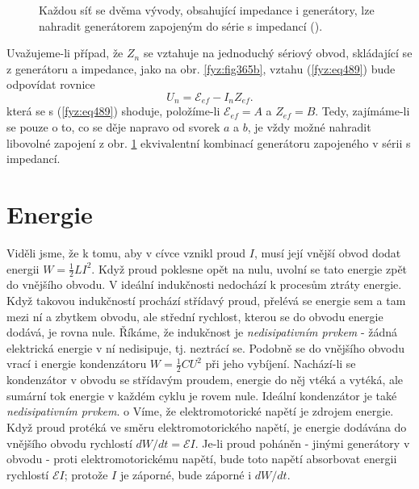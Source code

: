   \begin{figure}[hb!] %
    \centering
    \caption{Každou síť se dvěma vývody, obsahující impedance i generátory, lze nahradit 
             generátorem zapojeným do série s impedancí
             (\cite[s.~405]{Feynman02}).}
    \label{fyz:fig365}
  \end{figure}

  Uvažujeme-li případ, že \(Z_n\) se vztahuje na jednoduchý sériový obvod, skládající se z 
  generátoru a impedance, jako na obr. \ref{fyz:fig365b}, vztahu (\ref{fyz:eq489}) bude odpovídat 
  rovnice 
  \begin{equation*}
    U_n = \mathscr{E}_{ef} - I_nZ_{ef}.
  \end{equation*}
  která se s (\ref{fyz:eq489}) shoduje, položíme-li \(\mathscr{E}_{ef} = A\) a \(Z_{ef}= B\). Tedy, 
  zajímáme-li se pouze o to, co se děje napravo od svorek \(a\) a \(b\), je vždy možné nahradit 
  libovolné zapojení z obr. \ref{fyz:fig365} ekvivalentní kombinací generátoru zapojeného v sérii s 
  impedancí.
  
\section{Energie}\label{fyz:IIchapXXIIsecV}
  Viděli jsme, že k tomu, aby v cívce vznikl proud \(I\), musí její vnější obvod dodat energii \(W= 
  \frac{1}{2}LI^2\). Když proud poklesne opět na nulu, uvolní se tato energie zpět do vnějšího 
  obvodu. V ideální indukčnosti nedochází k procesům ztráty energie. Když takovou indukčností 
  prochází střídavý proud, přelévá se energie sem a tam mezi ní a zbytkem obvodu, ale střední 
  rychlost, kterou se do obvodu energie dodává, je rovna nule. Říkáme, že indukčnost je 
  \emph{nedisipativním prvkem} - žádná elektrická energie v ní nedisipuje, tj. neztrácí se. Podobně 
  se do vnějšího obvodu vrací i energie kondenzátoru \(W= \frac{1}{2}CU^2\) při jeho vybíjení. 
  Nachází-li se kondenzátor v obvodu se střídavým proudem, energie do něj vtéká a vytéká, ale 
  sumární tok energie v každém cyklu je rovem nule. Ideální kondenzátor je také 
  \emph{nedisipativním prvkem}. o Víme, že elektromotorické napětí je zdrojem energie. Když proud 
  protéká ve směru elektromotorického napětí, je energie dodávána do vnějšího obvodu rychlostí 
  \(dW/dt =\mathscr{E}I\). Je-li proud poháněn - jinými generátory v obvodu - proti 
  elektromotorickému napětí, bude toto napětí absorbovat energii rychlostí \(\mathscr{E}I\); 
  protože \(I\) je záporné, bude záporné i \(dW/dt\).

